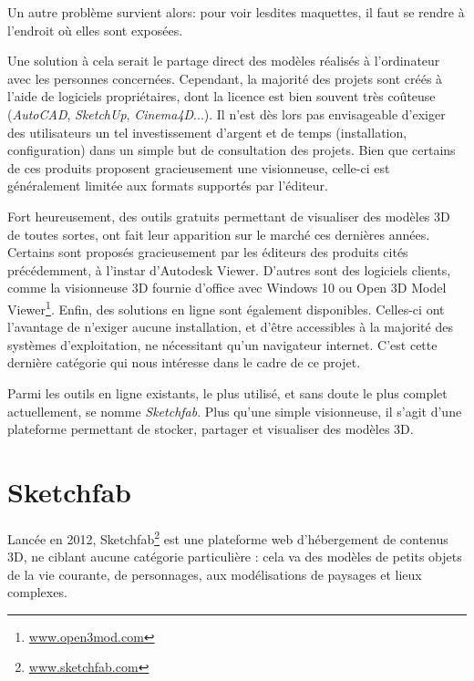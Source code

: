Un autre problème survient alors: pour voir lesdites maquettes, il faut se rendre à l'endroit où elles sont exposées.

Une solution à cela serait le partage direct des modèles réalisés à l'ordinateur avec les personnes concernées. Cependant, la majorité des projets sont créés à l'aide de logiciels propriétaires, dont la licence est bien souvent très coûteuse (\textit{AutoCAD}, \textit{SketchUp}, \textit{Cinema4D}...). Il n'est dès lors pas envisageable d'exiger des utilisateurs un tel investissement d'argent et de temps (installation, configuration) dans un simple but de consultation des projets.
Bien que certains de ces produits proposent gracieusement une visionneuse, celle-ci est généralement limitée aux formats supportés par l'éditeur.

Fort heureusement, des outils gratuits permettant de visualiser des modèles 3D de toutes sortes, ont fait leur apparition sur le marché ces dernières années. Certains sont proposés gracieusement par les éditeurs des produits cités précédemment, à l'instar d'Autodesk Viewer. D'autres sont des logiciels clients, comme la visionneuse 3D fournie d'office avec Windows 10 ou Open 3D Model Viewer\footnote{\url{www.open3mod.com}}. Enfin, des solutions en ligne sont également disponibles. Celles-ci ont l'avantage de n'exiger aucune installation, et d'être accessibles à la majorité des systèmes d'exploitation, ne nécessitant qu'un navigateur internet.
C'est cette dernière catégorie qui nous intéresse dans le cadre de ce projet.

Parmi les outils en ligne existants, le plus utilisé, et sans doute le plus complet actuellement, se nomme \textit{Sketchfab}. Plus qu'une simple visionneuse, il s'agit d'une plateforme permettant de stocker, partager et visualiser des modèles 3D. 

\section{Sketchfab} \label{sketchfab}

Lancée en 2012, Sketchfab\footnote{\url{www.sketchfab.com}} est une plateforme web d'hébergement de contenus 3D, ne ciblant aucune catégorie particulière : cela va des modèles de petits objets de la vie courante, de personnages, aux modélisations de paysages et lieux complexes.

